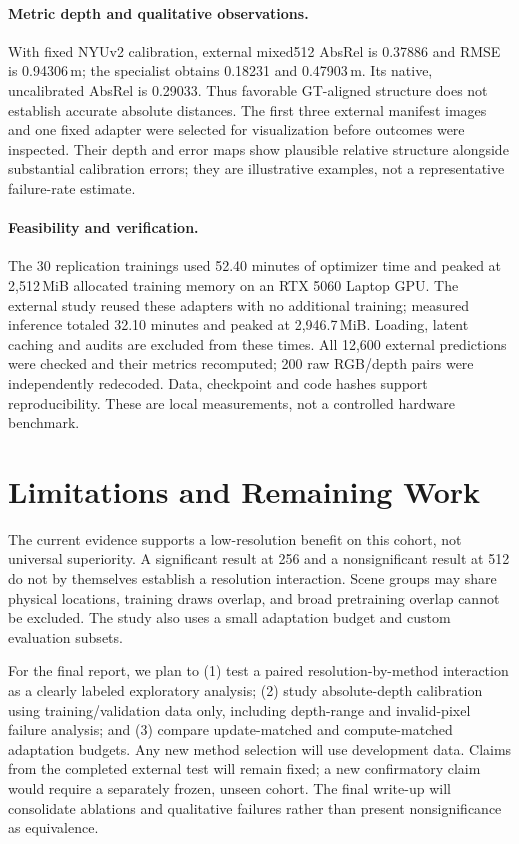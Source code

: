 \paragraph{Metric depth and qualitative observations.}
With fixed NYUv2 calibration, external mixed512 AbsRel is 0.37886 and RMSE is 0.94306\,m; the specialist obtains 0.18231 and 0.47903\,m. Its native, uncalibrated AbsRel is 0.29033. Thus favorable GT-aligned structure does not establish accurate absolute distances. The first three external manifest images and one fixed adapter were selected for visualization before outcomes were inspected. Their depth and error maps show plausible relative structure alongside substantial calibration errors; they are illustrative examples, not a representative failure-rate estimate.

\paragraph{Feasibility and verification.}
The 30 replication trainings used 52.40 minutes of optimizer time and peaked at 2,512\,MiB allocated training memory on an RTX 5060 Laptop GPU. The external study reused these adapters with no additional training; measured inference totaled 32.10 minutes and peaked at 2,946.7\,MiB. Loading, latent caching and audits are excluded from these times. All 12,600 external predictions were checked and their metrics recomputed; 200 raw RGB/depth pairs were independently redecoded. Data, checkpoint and code hashes support reproducibility. These are local measurements, not a controlled hardware benchmark.

\section{Limitations and Remaining Work}
The current evidence supports a low-resolution benefit on this cohort, not universal superiority. A significant result at 256 and a nonsignificant result at 512 do not by themselves establish a resolution interaction. Scene groups may share physical locations, training draws overlap, and broad pretraining overlap cannot be excluded. The study also uses a small adaptation budget and custom evaluation subsets.

For the final report, we plan to (1) test a paired resolution-by-method interaction as a clearly labeled exploratory analysis; (2) study absolute-depth calibration using training/validation data only, including depth-range and invalid-pixel failure analysis; and (3) compare update-matched and compute-matched adaptation budgets. Any new method selection will use development data. Claims from the completed external test will remain fixed; a new confirmatory claim would require a separately frozen, unseen cohort. The final write-up will consolidate ablations and qualitative failures rather than present nonsignificance as equivalence.


